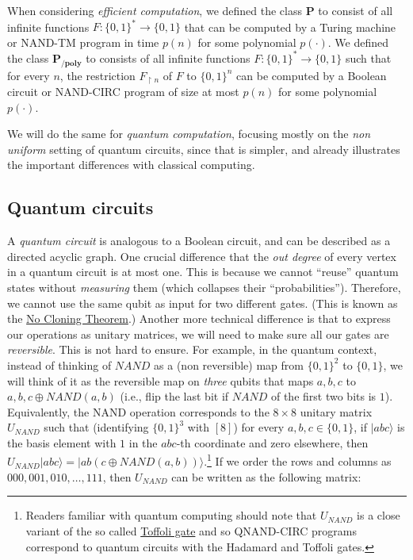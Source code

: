 When considering \emph{efficient computation}, we defined the class
\(\mathbf{P}\) to consist of all infinite functions
\(F:\{0,1\}^* \rightarrow \{0,1\}\) that can be computed by a Turing
machine or NAND-TM program in time \(p(n)\) for some polynomial
\(p(\cdot)\). We defined the class \(\mathbf{P_{/poly}}\) to consists of
all infinite functions \(F:\{0,1\}^* \rightarrow \{0,1\}\) such that for
every \(n\), the restriction \(F_{\upharpoonright n}\) of \(F\) to
\(\{0,1\}^n\) can be computed by a Boolean circuit or NAND-CIRC program
of size at most \(p(n)\) for some polynomial \(p(\cdot)\).

We will do the same for \emph{quantum computation}, focusing mostly on
the \emph{non uniform} setting of quantum circuits, since that is
simpler, and already illustrates the important differences with
classical computing.

\subsection{Quantum circuits}\label{Quantum-circuits}

A \emph{quantum circuit} is analogous to a Boolean circuit, and can be
described as a directed acyclic graph. One crucial difference that the
\emph{out degree} of every vertex in a quantum circuit is at most one.
This is because we cannot ``reuse'' quantum states without
\emph{measuring} them (which collapses their ``probabilities'').
Therefore, we cannot use the same qubit as input for two different
gates. (This is known as the \href{https://goo.gl/jCVtEY}{No Cloning
Theorem}.) Another more technical difference is that to express our
operations as unitary matrices, we will need to make sure all our gates
are \emph{reversible}. This is not hard to ensure. For example, in the
quantum context, instead of thinking of \(\ensuremath{\mathit{NAND}}\)
as a (non reversible) map from \(\{0,1\}^2\) to \(\{0,1\}\), we will
think of it as the reversible map on \emph{three} qubits that maps
\(a,b,c\) to \(a,b,c\oplus \ensuremath{\mathit{NAND}}(a,b)\) (i.e., flip
the last bit if \(\ensuremath{\mathit{NAND}}\) of the first two bits is
\(1\)). Equivalently, the NAND operation corresponds to the
\(8\times 8\) unitary matrix \(U_{NAND}\) such that (identifying
\(\{0,1\}^3\) with \([8]\)) for every \(a,b,c \in \{0,1\}\), if
\(|abc\rangle\) is the basis element with \(1\) in the \(abc\)-th
coordinate and zero elsewhere, then
\(U_{NAND} |abc\rangle =|ab(c \oplus \ensuremath{\mathit{NAND}}(a,b))\rangle\).\footnote{Readers
  familiar with quantum computing should note that \(U_{NAND}\) is a
  close variant of the so called \href{https://goo.gl/BE7aVG}{Toffoli
  gate} and so QNAND-CIRC programs correspond to quantum circuits with
  the Hadamard and Toffoli gates.} If we order the rows and columns as
\(000,001,010,\ldots,111\), then \(U_{NAND}\) can be written as the
following matrix:

